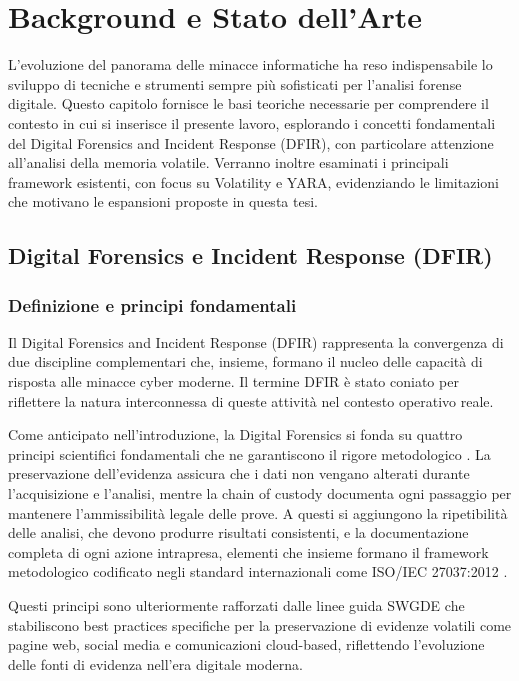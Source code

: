 \chapter{Background e Stato dell'Arte}

L'evoluzione del panorama delle minacce informatiche ha reso indispensabile lo sviluppo di tecniche e strumenti sempre più sofisticati per l'analisi forense digitale. Questo capitolo fornisce le basi teoriche necessarie per comprendere il contesto in cui si inserisce il presente lavoro, esplorando i concetti fondamentali del Digital Forensics and Incident Response (DFIR), con particolare attenzione all'analisi della memoria volatile. Verranno inoltre esaminati i principali framework esistenti, con focus su Volatility e YARA, evidenziando le limitazioni che motivano le espansioni proposte in questa tesi.

\section{Digital Forensics e Incident Response (DFIR)}

\subsection{Definizione e principi fondamentali}

Il Digital Forensics and Incident Response (DFIR) rappresenta la convergenza di due discipline complementari che, insieme, formano il nucleo delle capacità di risposta alle minacce cyber moderne. Il termine DFIR è stato coniato per riflettere la natura interconnessa di queste attività nel contesto operativo reale.

Come anticipato nell'introduzione, la Digital Forensics si fonda su quattro principi scientifici fondamentali che ne garantiscono il rigore metodologico \cite{kent2006}. La preservazione dell'evidenza assicura che i dati non vengano alterati durante l'acquisizione e l'analisi, mentre la chain of custody documenta ogni passaggio per mantenere l'ammissibilità legale delle prove. A questi si aggiungono la ripetibilità delle analisi, che devono produrre risultati consistenti, e la documentazione completa di ogni azione intrapresa, elementi che insieme formano il framework metodologico codificato negli standard internazionali come ISO/IEC 27037:2012 \cite{iso27037}.

Questi principi sono ulteriormente rafforzati dalle linee guida SWGDE \cite{swgde2022} che stabiliscono best practices specifiche per la preservazione di evidenze volatili come pagine web, social media e comunicazioni cloud-based, riflettendo l'evoluzione delle fonti di evidenza nell'era digitale moderna.

